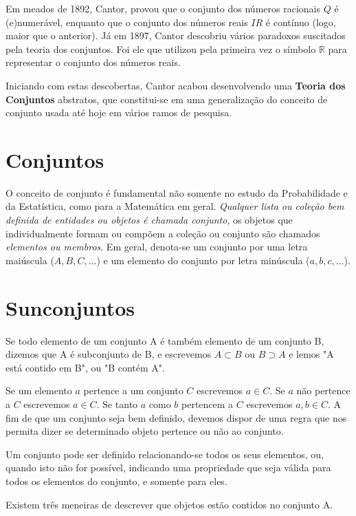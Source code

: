 \inic Em meados de 1892, Cantor, provou que o conjunto dos números racionais $Q$ é (e)numerável, enquanto que o conjunto dos números reais $IR$ é contínuo (logo, maior que o anterior). Já em 1897, Cantor descobriu vários paradoxos suscitados pela teoria dos conjuntos. Foi ele que utilizou pela primeira vez o símbolo ${\displaystyle \mathbb {R}}$ para representar o conjunto dos números reais.\vskip0.3cm


\inic Iniciando com estas descobertas, Cantor acabou desenvolvendo uma \textbf{Teoria dos Conjuntos} abstratos, que constitui-se em uma generalização do conceito de conjunto usada até hoje em vários ramos de pesquisa. 


\section{Conjuntos}

O conceito de conjunto é fundamental não somente no estudo da
Probabilidade e da Estatística, como para a Matemática em geral.
\emph{Qualquer lista ou coleção bem definida de entidades ou
objetos é chamada conjunto}, os objetos que individualmente formam
ou compõem a coleção ou conjunto são chamados \emph{elementos ou
membros}. Em geral, denota-se um conjunto por uma letra maiúscula
($A,B,C,...$) e um elemento do conjunto por letra minúscula
($a,b,c,...$).\vskip0.3cm

\section{Sunconjuntos}

Se todo elemento de um conjunto A é também elemento de um conjunto
B, dizemos que A é subconjunto de B, e escrevemos $A \subset B $
ou $B \supset A$ e lemos "A está contido em B", ou "B contém
A".\vskip0.3cm

Se um elemento $a$ pertence a um conjunto $C$ escrevemos $a \in
C$. Se $a$ não pertence a $C$ escrevemos $a \in C$. Se tanto $a$
como $b$ pertencem a $C$ escrevemos $a,b \in C$. A fim de que um
conjunto seja bem definido, devemos dispor de uma regra que nos
permita dizer se determinado objeto pertence ou não ao
conjunto.\vskip0.3cm

Um conjunto pode ser definido relacionando-se todos os seus
elementos, ou, quando isto não for possível, indicando uma
propriedade que seja válida para todos os elementos do conjunto, e
somente para eles.\vskip0.3cm


Existem três meneiras de descrever que objetos estão contidos no
conjunto A.

